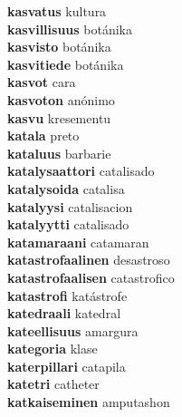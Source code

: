 \textbf{kasvatus } kultura \\
\textbf{kasvillisuus } botánika \\
\textbf{kasvisto } botánika \\
\textbf{kasvitiede } botánika \\
\textbf{kasvot } cara \\
\textbf{kasvoton } anónimo \\
\textbf{kasvu } kresementu \\
\textbf{katala } preto \\
\textbf{kataluus } barbarie \\
\textbf{katalysaattori } catalisado \\
\textbf{katalysoida } catalisa \\
\textbf{katalyysi } catalisacion \\
\textbf{katalyytti } catalisado \\
\textbf{katamaraani } catamaran \\
\textbf{katastrofaalinen } desastroso \\
\textbf{katastrofaalisen } catastrofico \\
\textbf{katastrofi } katástrofe \\
\textbf{katedraali } katedral \\
\textbf{kateellisuus } amargura \\
\textbf{kategoria } klase \\
\textbf{katerpillari } catapila \\
\textbf{katetri } catheter \\
\textbf{katkaiseminen } amputashon \\
